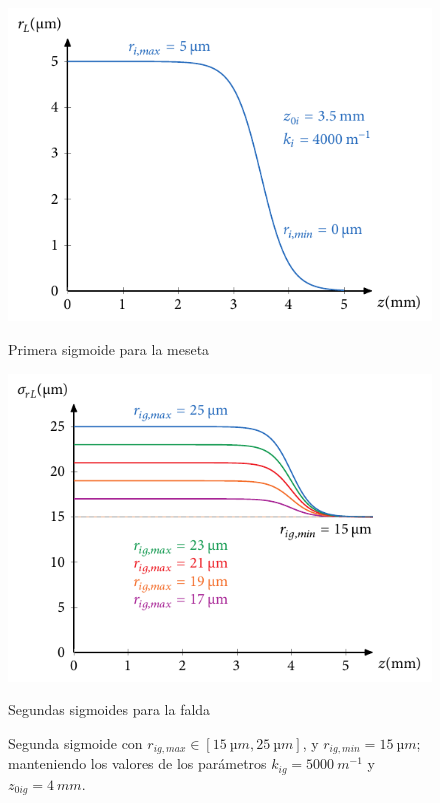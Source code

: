 \begin{figure}[htbp]
  \centering
  \begin{subcaptionblock}{.4\textwidth}
    \centering
    \includegraphics[width=\textwidth]{Figuras/ch4_ejsigm3.pdf}
    \caption{Primera sigmoide para la meseta}\label{fig:ch4_sigm1_rg}
  \end{subcaptionblock}
  \begin{subcaptionblock}{.4\textwidth}
    \centering
    \includegraphics[width=\textwidth]{Figuras/ch4_sigm_rg.pdf}
    \caption{Segundas sigmoides para la falda}\label{fig:ch4_sigm2_rg}
  \end{subcaptionblock}
  \caption{Segunda sigmoide con $r_{ig,max}\in[\qty{15}{µm},\qty{25}{µm}]$, y $r_{ig,min}=\qty{15}{µm}$; manteniendo los valores de los parámetros $k_{ig}=\qty{5000}{m^{-1}}$ y $z_{0ig}=\qty{4}{mm}$.}
   \label{fig:4.20}
\end{figure}


